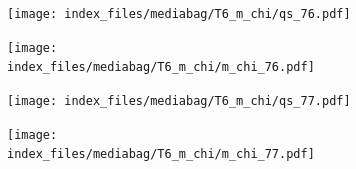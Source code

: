 \documentclass[
  11pt,
  letterpaper,
]{scrreprt}
\begin{document}
\begin{figure}

\begin{minipage}{0.50\linewidth}

\begin{figure}[H]

{\centering \texttt{[image: index\_files/mediabag/T6\_m\_chi/qs\_76.pdf]}

}


\end{figure}%

\end{minipage}%
%
\begin{minipage}{0.50\linewidth}

\begin{figure}[H]

{\centering \texttt{[image: index\_files/mediabag/T6\_m\_chi/m\_chi\_76.pdf]}

}


\end{figure}%

\end{minipage}%

\end{figure}%

\begin{figure}

\begin{minipage}{0.50\linewidth}

\begin{figure}[H]

{\centering \texttt{[image: index\_files/mediabag/T6\_m\_chi/qs\_77.pdf]}

}


\end{figure}%

\end{minipage}%
%
\begin{minipage}{0.50\linewidth}

\begin{figure}[H]

{\centering \texttt{[image: index\_files/mediabag/T6\_m\_chi/m\_chi\_77.pdf]}

}


\end{figure}%

\end{minipage}%

\end{figure}%
\end{document}

